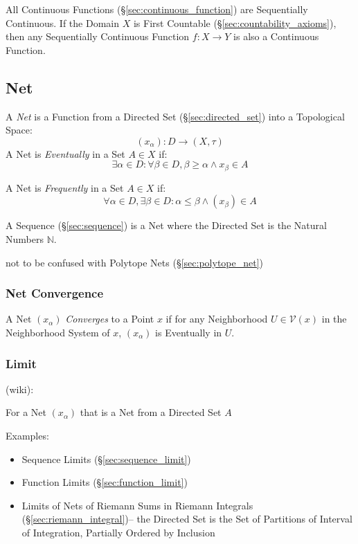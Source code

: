 All Continuous Functions (\S\ref{sec:continuous_function}) are
Sequentially Continuous. If the Domain $X$ is First Countable
(\S\ref{sec:countability_axioms}), then any Sequentially Continuous
Function $f : X \rightarrow Y$ is also a Continuous Function.



\subsection{Net}\label{sec:net}

A \emph{Net} is a Function from a Directed Set (\S\ref{sec:directed_set}) into
a Topological Space:
\[
  (x_\alpha) : D \rightarrow (X, \tau)
\]
A Net is \emph{Eventually} in a Set $A \in X$ if:
\[
  \exists \alpha \in D
  : \forall \beta \in D, \beta \geq \alpha \wedge x_\beta \in A
\]

A Net is \emph{Frequently} in a Set $A \in X$ if:
\[
  \forall \alpha \in D, \exists \beta \in D
  : \alpha \leq \beta \wedge (x_\beta) \in A
\]

A Sequence (\S\ref{sec:sequence}) is a Net where the Directed Set is the
Natural Numbers $\mathbb{N}$.

\fist not to be confused with Polytope Nets (\S\ref{sec:polytope_net})



\subsubsection{Net Convergence}\label{sec:net_convergence}

A Net $(x_\alpha)$ \emph{Converges} to a Point $x$ if for any
Neighborhood $U \in \mathcal{V}(x)$ in the Neighborhood System of $x$,
$(x_\alpha)$ is Eventually in $U$.



\subsubsection{Limit}\label{sec:net_limit}

(wiki):

For a Net $(x_\alpha)$ that is a Net from a Directed Set $A$

Examples:

\begin{itemize}
  \item Sequence Limits (\S\ref{sec:sequence_limit})
  \item Function Limits (\S\ref{sec:function_limit})
  \item Limits of Nets of Riemann Sums in Riemann Integrals
    (\S\ref{sec:riemann_integral})-- the Directed Set is the Set of Partitions
    of Interval of Integration, Partially Ordered by Inclusion
\end{itemize}



